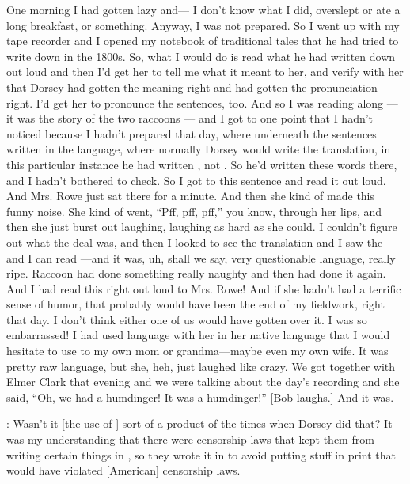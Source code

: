 \documentclass[output=paper]{LSP/langsci}
\begin{document}
One morning I had gotten lazy and--- I don't know what I did, overslept or ate a long breakfast, or something. Anyway, I was not prepared. So I went up with my tape recorder and I opened my notebook of  traditional tales that he had tried to write down in the 1800s. So, what I would do is read what he had written down out loud and then I'd get her to tell me what it meant to her, and verify with her that Dorsey had gotten the meaning right and had gotten the pronunciation right. I'd get her to pronounce the sentences, too. And so I was reading along --- it was the story of the two raccoons --- and I got to one point that I hadn't noticed because I hadn't prepared that day, where underneath the sentences written in the  language, where normally Dorsey would write the  translation, in this particular instance he had written , not . So he'd written these  words there, and I hadn't bothered to check. So I got to this sentence and read it out loud. And Mrs. Rowe just sat there for a minute. And then she kind of made this funny noise. She kind of went, ``Pff, pff, pff,'' you know, through her lips, and then she just burst out laughing, laughing as hard as she could. I couldn't figure out what the deal was, and then I looked to see the translation and I saw the ---and I can read ---and it was, uh, shall we say, very questionable language, really ripe. Raccoon had done something really naughty and then had done it again. And I had read this right out loud to Mrs. Rowe! And if she hadn't had a terrific sense of humor, that probably would have been the end of my fieldwork, right that day. I don't think either one of us would have gotten over it. I was so embarrassed! I had used language with her in her native language that I would hesitate to use to my own mom or grandma---maybe even my own wife. It was pretty raw language, but she, heh, just laughed like crazy. We got together with Elmer Clark that evening and we were talking about the day's recording and she said, ``Oh, we had a humdinger! It was a humdinger!'' [Bob laughs.] And it was.

: Wasn't it [the use of ] sort of a product of the times when Dorsey did that? It was my understanding that there were censorship laws that kept them from writing certain things in , so they wrote it in  to avoid putting stuff in print that would have violated [American] censorship laws.
\end{document}
